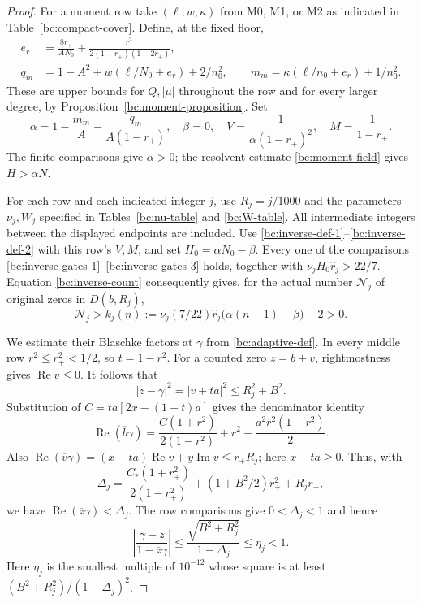 \documentclass[11pt,reqno]{amsart}
\numberwithin{equation}{section}
\theoremstyle{definition}
\theoremstyle{remark}
\renewcommand{\Re}{\operatorname{Re}}
\renewcommand{\Im}{\operatorname{Im}}
\begin{document}
\begin{proof}
For a moment row take $(\ell,w,\kappa)$ from M0, M1, or M2 as
indicated in Table~\ref{bc:compact-cover}.  Define, at the fixed floor,
\begin{align}
 e_r&=\frac{8r_+}{AN_0}
            +\frac{r_+^2}{2(1-r_+)(1-2r_+)},\nonumber\\
 q_m&=1-A^2+w(\ell/N_0+e_r)+2/n_0^2,\qquad
 m_m=\kappa(\ell/n_0+e_r)+1/n_0^2.                \label{bc:compact-moments}
\end{align}
These are upper bounds for $Q,|\mu|$ throughout the row
and for every larger degree, by Proposition~\ref{bc:moment-proposition}.
Set
\begin{equation}\label{bc:compact-moment-field}
 \alpha=1-\frac{m_m}A-\frac{q_m}{A(1-r_+)},\quad
 \beta=0,\quad V=\frac1{\alpha(1-r_+)^2},\quad
 M=\frac1{1-r_+}.
\end{equation}
The finite comparisons give $\alpha>0$; the resolvent estimate
\eqref{bc:moment-field} gives $H>\alpha N$.

For each row and each indicated integer $j$, use $R_j=j/1000$ and
the parameters $\nu_j,W_j$ specified in
Tables~\ref{bc:nu-table} and \ref{bc:W-table}.
All intermediate integers between the displayed endpoints are included.
Use \eqref{bc:inverse-def-1}--\eqref{bc:inverse-def-2} with this row's
$V,M$, and set $H_0=\alpha N_0-\beta$.
Every one of the comparisons
\eqref{bc:inverse-gates-1}--\eqref{bc:inverse-gates-3} holds, together
with $\nu_jH_0\widehat r_j>22/7$.
Equation \eqref{bc:inverse-count} consequently gives, for the actual
number $\mathcal N_j$ of original zeros in $D(b,R_j)$,
\begin{equation}\label{bc:nested-count}
 \mathcal N_j>k_j(n):=
      \nu_j(7/22)\widehat r_j\bigl(\alpha(n-1)-\beta\bigr)-2>0.
\end{equation}

We estimate their Blaschke factors at $\gamma$ from
\eqref{bc:adaptive-def}.  In every middle row
$r^2\leq r_+^2<1/2$, so $t=1-r^2$.
For a counted zero $z=b+v$, rightmostness gives $\Re v\leq0$.
It follows that
\[
 |z-\gamma|^2=|v+ta|^2\leq R_j^2+B^2.
\]
Substitution of $C=ta[2x-(1+t)a]$ gives the denominator identity
\begin{equation}\label{bc:correlated-denominator}
 \Re(\overline b\gamma)
 =\frac{C(1+r^2)}{2(1-r^2)}
        +r^2+\frac{a^2r^2(1-r^2)}2.
\end{equation}
Also
$\Re(\overline v\gamma)=(x-ta)\Re v+y\Im v\leq r_+R_j$;
here $x-ta\geq0$.  Thus, with
\begin{equation}\label{bc:Delta-def}
 \Delta_j=
 \frac{C_*(1+r_+^2)}{2(1-r_+^2)}
       +(1+B^2/2)r_+^2+R_jr_+,
\end{equation}
we have $\Re(\overline z\gamma)<\Delta_j$.
The row comparisons give $0<\Delta_j<1$ and hence
\begin{equation}\label{bc:factor-bound}
 \left|\frac{\gamma-z}{1-\overline z\gamma}\right|
 \leq\frac{\sqrt{B^2+R_j^2}}{1-\Delta_j}\leq\eta_j<1.
\end{equation}
Here $\eta_j$ is the smallest multiple of $10^{-12}$ whose square is
at least $(B^2+R_j^2)/(1-\Delta_j)^2$.


\end{proof}
\end{document}
